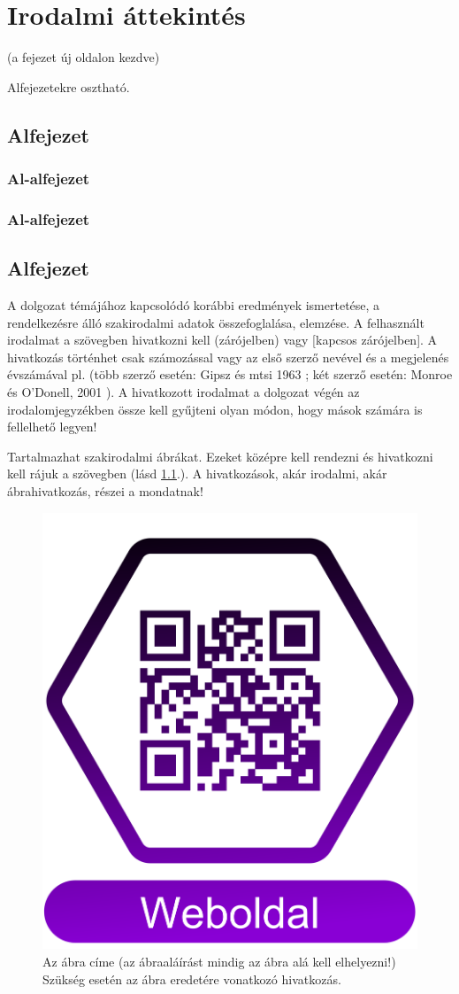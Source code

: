 \documentclass[a4paper,12pt]{report}
\theoremstyle{definition}
\theoremstyle{remark}
\begin{document}
\chapter{Irodalmi áttekintés}

(a fejezet új oldalon kezdve) 


Alfejezetekre osztható.

\section{Alfejezet}
\subsection{Al-alfejezet}
\subsection{Al-alfejezet}
\section{Alfejezet}



A dolgozat témájához kapcsolódó korábbi eredmények ismertetése, a rendelkezésre álló szakirodalmi adatok összefoglalása, elemzése. 
A felhasznált irodalmat a szövegben hivatkozni kell (zárójelben) vagy [kapcsos zárójelben]. A hivatkozás történhet csak számozással \cite{ALE3} vagy az első szerző nevével és a megjelenés évszámával pl. (több szerző esetén:  Gipsz és mtsi 1963 \cite{WSB}; két szerző esetén: Monroe és O’Donell, 2001 \cite{MD}). A hivatkozott irodalmat a dolgozat végén az irodalomjegyzékben össze kell gyűjteni olyan módon, hogy mások számára is fellelhető legyen!

Tartalmazhat szakirodalmi ábrákat. Ezeket középre kell rendezni és hivatkozni kell rájuk a szövegben (lásd \ref{fig:korok}.). A hivatkozások, akár irodalmi, akár ábrahivatkozás, részei a mondatnak!

\begin{figure}
\centering
\includegraphics[height=7 cm]{b4918.png}
\caption{ \label{fig:korok} Az ábra címe (az ábraaláírást mindig az ábra alá kell elhelyezni!)
Szükség esetén az ábra eredetére vonatkozó hivatkozás.
}
\end{figure}
\end{document}
